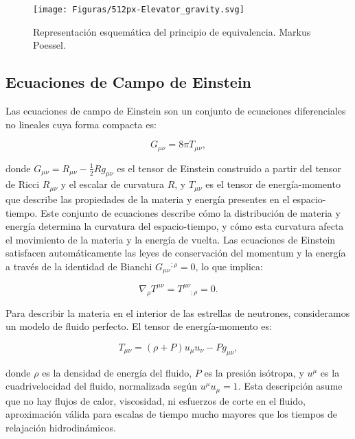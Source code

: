 \begin{figure}[h]
	\centering
	\texttt{[image: Figuras/512px-Elevator\_gravity.svg]}
	\caption[Principio de equivalencia]{Representación esquemática del principio de equivalencia. Markus Poessel.}
	\label{fig:equivalence_principle}
\end{figure}

\subsection{Ecuaciones de Campo de Einstein}

Las ecuaciones de campo de Einstein son un conjunto de ecuaciones diferenciales no lineales cuya forma compacta es:

\begin{equation}
	G_{\mu\nu} = 8\pi T_{\mu\nu},
	\label{eq:einstein_field}
\end{equation}

donde $G_{\mu\nu} = R_{\mu\nu} - \frac{1}{2}Rg_{\mu\nu}$ es el tensor de Einstein construido a partir del tensor de Ricci $R_{\mu\nu}$ y el escalar de curvatura $R$, y $T_{\mu\nu}$ es el tensor de energía-momento que describe las propiedades de la materia y energía presentes en el espacio-tiempo. Este conjunto de ecuaciones describe cómo la distribución de materia y energía determina la curvatura del espacio-tiempo, y cómo esta curvatura afecta el movimiento de la materia y la energía de vuelta. Las ecuaciones de Einstein satisfacen automáticamente las leyes de conservación del momentum y la energía a través de la identidad de Bianchi $G_{\mu\nu}{}^{;\rho} = 0$, lo que implica:

\begin{equation}
	\nabla_\rho T^{\mu\nu} = T^{\mu\nu}{}_{;\rho} = 0.
\end{equation}

Para describir la materia en el interior de las estrellas de neutrones, consideramos un modelo de fluido perfecto. El tensor de energía-momento es:

\begin{equation}
	T_{\mu\nu} = (\rho + P)u_\mu u_\nu - Pg_{\mu\nu},
	\label{eq:tensor_fluido_perfecto}
\end{equation}

donde $\rho$ es la densidad de energía del fluido, $P$ es la presión isótropa, y $u^\mu$ es la cuadrivelocidad del fluido, normalizada según $u^\mu u_\mu = 1$. Esta descripción asume que no hay flujos de calor, viscosidad, ni esfuerzos de corte en el fluido, aproximación válida para escalas de tiempo mucho mayores que los tiempos de relajación hidrodinámicos.

